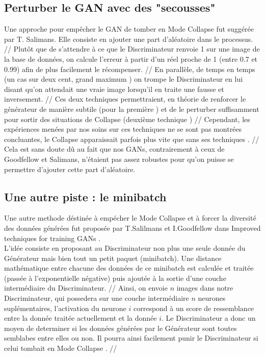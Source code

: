 		\subsection {Perturber le GAN avec des "secousses" } 
		Une approche pour empêcher le GAN de tomber en Mode Collapse fut suggérée par T. Salimans. Elle consiste en ajouter une part d'aléatoire dans le processus. //
	Plutôt que de s'attendre à ce que le Discriminateur renvoie 1 sur une image de la base de données, on calcule l'erreur à partir d'un réel proche de 1 (entre 0.7 et 0.99) afin de plus facilement le récompenser. //
	En parallèle, de temps en temps (un cas sur deux cent, grand maximum ) on trompe le Discriminateur en lui disant qu'on attendait une vraie image lorsqu'il en traite une fausse et inversement. //
	Ces deux techniques permettraient, en théorie de renforcer le générateur de manière subtile (pour la première ) et de le perturber suffisamment pour sortir des situations de Collapse (deuxième technique ) //
	Cependant, les expériences menées par nos soins sur ces techniques ne se sont pas montrées concluantes, le Collapse apparaissait parfois plus vite que sans ses techniques . //
	Cela est sans doute dû au fait que nos GANs, contrairement à ceux de Goodfellow et Salimans, n'étaient pas assez robustes pour qu'on puisse se permettre d'ajouter cette part d'aléatoire. 
	
	

	\subsection{Une autre piste : le minibatch}
		Une autre methode déstinée à empécher le Mode Collapse et à forcer la diversité des données générées fut proposée par T.Salilmans et I.Goodfellow dans Improved techniques for training GANs \cite{salimans_improved_2016}.\\
		L'idée consiste en proposant au Discriminateur non plus une seule donnée du Générateur mais bien tout un petit paquet (minibatch). Une distance mathématique entre chacune des données de ce minibatch est calculée et traitée (passée à l'exponentielle négative) puis ajoutée à la sortie d'une couche intermédiaire du Discriminateur. //
		Ainsi, on envoie $n$ images dans notre Discriminateur, qui possedera sur une couche intermédiaire $n$ neurones suplémentaires, l'activation du neurone $i$ correspond à un score de ressemblance entre la donnée traitée actuellement et la donnée $i$. Le Discriminateur a donc un moyen de determiner si les données générées par le Générateur sont toutes semblabes entre elles ou non. Il pourra ainsi facilement punir le Discriminateur si celui tombait en Mode Collapse . //
		
